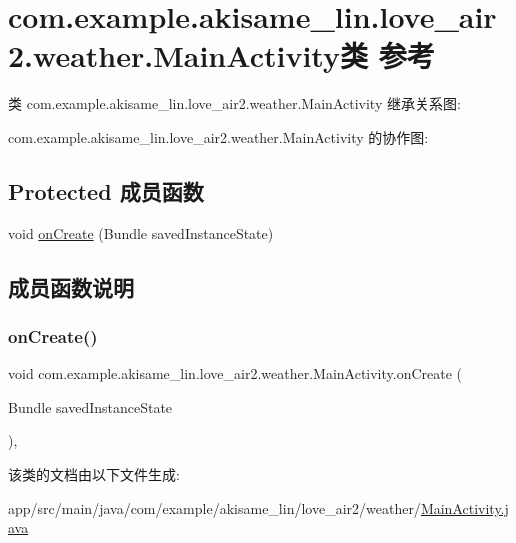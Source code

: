 \hypertarget{classcom_1_1example_1_1akisame__lin_1_1love__air2_1_1weather_1_1_main_activity}{}\section{com.\+example.\+akisame\+\_\+lin.\+love\+\_\+air2.\+weather.\+Main\+Activity类 参考}
\label{classcom_1_1example_1_1akisame__lin_1_1love__air2_1_1weather_1_1_main_activity}


类 com.\+example.\+akisame\+\_\+lin.\+love\+\_\+air2.\+weather.\+Main\+Activity 继承关系图\+:


com.\+example.\+akisame\+\_\+lin.\+love\+\_\+air2.\+weather.\+Main\+Activity 的协作图\+:
\subsection*{Protected 成员函数}
\begin{DoxyCompactItemize}
\item 
void \mbox{\hyperlink{classcom_1_1example_1_1akisame__lin_1_1love__air2_1_1weather_1_1_main_activity_ab941d93ab86807dd1fa423acf9aeeac5}{on\+Create}} (Bundle saved\+Instance\+State)
\end{DoxyCompactItemize}


\subsection{成员函数说明}
\mbox{\label{classcom_1_1example_1_1akisame__lin_1_1love__air2_1_1weather_1_1_main_activity_ab941d93ab86807dd1fa423acf9aeeac5}} 
\subsubsection{\texorpdfstring{onCreate()}{onCreate()}}
{\footnotesize\ttfamily void com.\+example.\+akisame\+\_\+lin.\+love\+\_\+air2.\+weather.\+Main\+Activity.\+on\+Create (\begin{DoxyParamCaption}\item[{Bundle}]{saved\+Instance\+State }\end{DoxyParamCaption})\hspace{0.3cm}{\ttfamily [inline]}, {\ttfamily [protected]}}



该类的文档由以下文件生成\+:\begin{DoxyCompactItemize}
\item 
app/src/main/java/com/example/akisame\+\_\+lin/love\+\_\+air2/weather/\mbox{\hyperlink{java_2com_2example_2akisame__lin_2love__air2_2weather_2_main_activity_8java}{Main\+Activity.\+java}}\end{DoxyCompactItemize}
